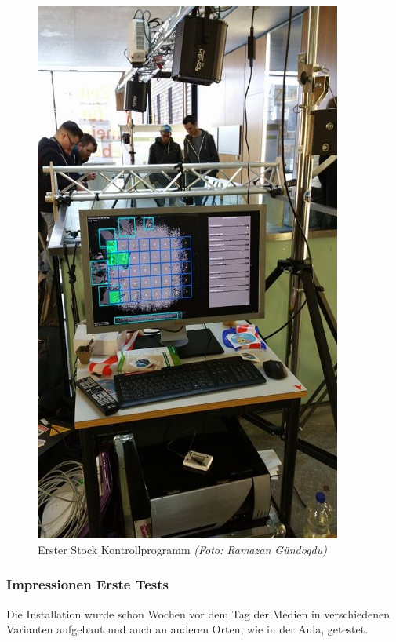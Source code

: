 \begin{figure}[htbp]
	\centering
		\includegraphics[width=0.9\textwidth]{images/TdM4.jpg}
	\caption{Erster Stock Kontrollprogramm \textit{(Foto: Ramazan Gündogdu)}}
	\label{fig:TdM4}
\end{figure}

\clearpage

\subsubsection{Impressionen Erste Tests}
Die Installation wurde schon Wochen vor dem Tag der Medien in verschiedenen Varianten aufgebaut und auch an anderen Orten, wie in der Aula, getestet.

